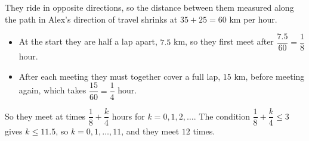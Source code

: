 They ride in opposite directions, so the distance between them measured along the path in Alex's direction of travel shrinks at $35+25=60$ km per hour.
\begin{itemize}
\item At the start they are half a lap apart, $7.5$ km, so they first meet after $\dfrac{7.5}{60}=\dfrac{1}{8}$ hour.
\item After each meeting they must together cover a full lap, $15$ km, before meeting again, which takes $\dfrac{15}{60}=\dfrac{1}{4}$ hour.
\end{itemize}
So they meet at times $\dfrac{1}{8}+\dfrac {k}{4}$ hours for $k=0,1,2,\dots$. The condition $\dfrac{1}{8}+\dfrac {k}{4}\le3$ gives $k\le11.5$, so $k=0,1,\dots,11$, and they meet $\boxed{12}$ times.

